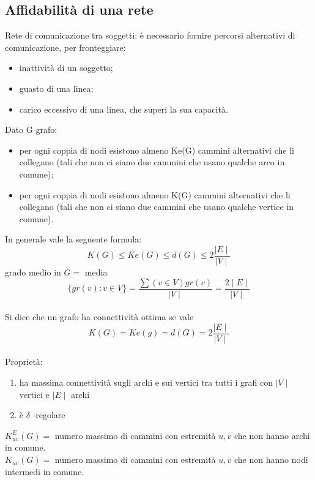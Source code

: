 \subsection{Affidabilità di una rete}

Rete di comunicazione tra soggetti: è necessario fornire percorsi alternativi di comunicazione, per fronteggiare:
\begin{itemize}
\item inattività di un soggetto;
\item guasto di una linea;
\item carico eccessivo di una linea, che superi la sua capacità.
\end{itemize}

Dato G grafo:
\begin{itemize}
\item per ogni coppia di nodi esistono almeno Ke(G) cammini alternativi che li collegano (tali che non ci
siano due cammini che usano qualche arco in comune);
\item per ogni coppia di nodi esistono almeno K(G) cammini alternativi che li collegano (tali che non ci
siano due cammini che usano qualche vertice in comune).
\end{itemize}
In generale vale la seguente formula: \\
\[K(G) \leq Ke(G) \leq d(G) \leq 2 \frac{ \mid E \mid}{\mid V \mid} \] grado medio in $G =$ media \[ \{ gr(v) : v \in V \} = \frac{\sum(v \in V) gr(v)}{ \mid V \mid} = \frac{2 \mid E \mid}{\mid V \mid} \] \\
Si dice che un grafo ha connettività ottima se vale \[ K(G) = Ke(g) = d(G) = 2 \frac{\mid E \mid}{\mid V \mid} \] \\
Proprietà:
\begin{enumerate}
\item ha massima connettività sugli archi e sui vertici tra tutti i grafi con $\mid V \mid$ vertici e $\mid E \mid$ archi
\item è $\delta$ -regolare
\end{enumerate}

\(K^E_{uv} (G) =\) numero massimo di cammini con estremità $u,v$ che non hanno archi in comune. \\
\(K_{uv} (G) =\) numero massimo di cammini con estremità $u,v$ che non hanno nodi intermedi in comune. \\











\newpage
